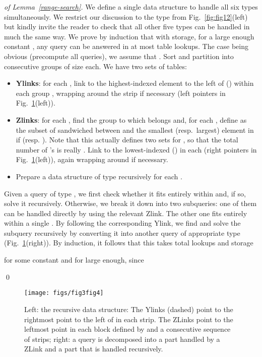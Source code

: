\documentclass[oribibl,envcountsect,envcountsame]{llncs}
\begin{document}
\begin{proof}[of Lemma~\ref{range-search}]
We define a single data structure to handle all six types
simultaneously. We restrict our discussion to the type  from
Fig.~\ref{fig:fig12}(left) but kindly invite the reader to 
check that all other five types can be handled in much the same way.
We prove by induction that with  storage, for a
large enough constant , any query can be answered in at most  
table lookups.
The case  being obvious (precompute all queries),
we assume that .
Sort and partition  into consecutive groups 
of size  each. We have two sets of tables:


\begin{itemize}
\item
\textbf{Ylinks}: for each , 
link  to the highest-indexed element  to the left of  () 
within each group , wrapping around the
strip if necessary
(left pointers in Fig.~\ref{fig:fig34}(left)).
\item
\textbf{Zlinks}: for each , 
find the group  to which  belongs and,
for each , define  as the subset of 
sandwiched  between  and the smallest (resp.~largest) 
element in  if  (resp.  ).
Note that this actually defines two sets for , so that
the total number of 's is really .
Link  to the lowest-indexed  () in each 
(right pointers in Fig.~\ref{fig:fig34}(left)), again
wrapping around if necessary.

\item
Prepare a data structure of type  recursively for each .
\end{itemize}

Given a query  of type , we first 
check whether it
fits entirely within  and, if so, solve it recursively.
Otherwise, we break it down into two subqueries: 
one of them can be handled directly by using the relevant Zlink.
The other one fits entirely within a single .
By following the corresponding Ylink, we find 
and solve the subquery recursively by converting it
into another query  of appropriate type
(Fig.~\ref{fig:fig34}(right)).
By induction, it follows that this takes  total lookups and storage 

for some constant  and for  large enough, since

\qed\end{proof}

\begin{figure}
\begin{center}
\texttt{[image: figs/fig3fig4]}
\end{center}
\caption{Left: the recursive data structure: The Ylinks (dashed) point
to the rightmost point to the left of  in each strip.
The ZLinks point to the leftmost point in each block defined by
 and a consecutive sequence of strips; right:
a query  is decomposed into a part handled by
a ZLink and a part that is handled recursively. }
\label{fig:fig34}
\end{figure}
\end{document}
